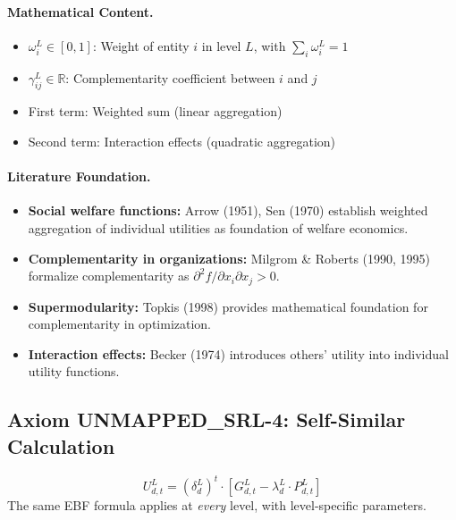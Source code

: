 \paragraph{Mathematical Content.}
\begin{itemize}
\item $\omega^L_i \in [0,1]$: Weight of entity $i$ in level $L$, with $\sum_i \omega^L_i = 1$
\item $\gamma^L_{ij} \in \mathbb{R}$: Complementarity coefficient between $i$ and $j$
\item First term: Weighted sum (linear aggregation)
\item Second term: Interaction effects (quadratic aggregation)
\end{itemize}

\paragraph{Literature Foundation.}
\begin{itemize}
\item \textbf{Social welfare functions:} Arrow (1951), Sen (1970) establish 
weighted aggregation of individual utilities as foundation of welfare economics.
\item \textbf{Complementarity in organizations:} Milgrom \& Roberts (1990, 1995) 
formalize complementarity as $\partial^2 f / \partial x_i \partial x_j > 0$.
\item \textbf{Supermodularity:} Topkis (1998) provides mathematical foundation 
for complementarity in optimization.
\item \textbf{Interaction effects:} Becker (1974) introduces others' utility 
into individual utility functions.
\end{itemize}

\subsection{Axiom UNMAPPED_SRL-4: Self-Similar Calculation}

\begin{tcolorbox}[colback=gray!5!white, colframe=gray!75!black, title=Axiom UNMAPPED_SRL-4: Self-Similarity]
\begin{equation}
\boxed{
U^L_{d,t} = (\delta^L_d)^t \cdot \left[ G^L_{d,t} - \lambda^L_d \cdot P^L_{d,t} \right]
}
\end{equation}
The same EBF formula applies at \emph{every} level, with level-specific parameters.
\end{tcolorbox}

